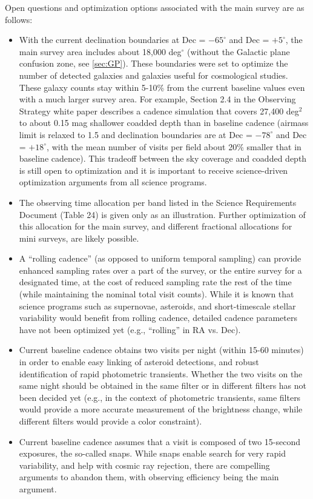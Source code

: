 \documentclass[DM,lsstdraft,toc,usenatbib]{lsstdoc}
\begin{document}
Open questions and optimization options associated with the main survey are as follows: 
\begin{itemize}
\item With the current declination boundaries at Dec = $-65^\circ$ and Dec = $+5^\circ$,
the main survey area includes about 18,000 deg$^\circ$ (without the Galactic plane 
confusion zone, see \ref{sec:GP}). These boundaries were set to optimize the number of
detected galaxies and galaxies useful for cosmological studies. These galaxy counts 
stay within 5-10\% from the current baseline values even with a much larger survey area. 
For example, Section 2.4 in the Observing Strategy white paper describes a cadence simulation 
that covers 27,400 deg$^2$ to about 0.15 mag shallower coadded depth than in baseline 
cadence (airmass limit is relaxed to 1.5 and declination boundaries are at Dec = $-78^\circ$ 
and Dec = $+18^\circ$, with the mean number of visits per field about 20\% smaller that
in baseline cadence). This tradeoff between the sky coverage and coadded depth is still
open to optimization and it is important to receive science-driven optimization arguments
from all science programs. 
\item The observing time allocation per band listed in the Science Requirements Document
(Table 24) is given only as an illustration. Further optimization of this allocation for the main 
survey, and different fractional allocations for mini surveys, are likely possible. 
\item A ``rolling cadence'' (as opposed to uniform temporal sampling) can provide enhanced
sampling rates over a part of the survey, or the entire survey for a designated time, at the
cost of reduced sampling rate the rest of the time (while maintaining the nominal total 
visit counts). While it is known that science programs such as supernovae, asteroids, and
short-timescale stellar variability would benefit from rolling cadence, detailed cadence
parameters have not been optimized yet (e.g., ``rolling'' in RA vs. Dec). 
\item Current baseline cadence obtains two visits per night (within 15-60 minutes) in 
order to enable easy linking of asteroid detections, and robust identification of rapid 
photometric transients. Whether the two visits on the same night should be obtained 
in the same filter or in different filters has not been decided yet (e.g., in the context
of photometric transients, same filters would provide a more accurate measurement
of the brightness change, while different filters would provide a color constraint). 
\item Current baseline cadence assumes that a visit is composed of two 15-second
exposures, the so-called snaps. While snaps enable search for very rapid variability,
and help with cosmic ray rejection, there are compelling arguments to abandon
them, with observing efficiency being the main argument. 
\end{itemize}
\end{document}
